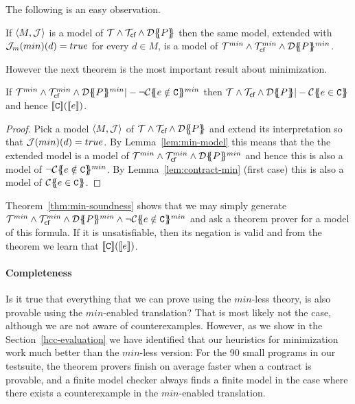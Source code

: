 The following is an easy observation.
\begin{lemma}\label{lem:min-model} If $\langle M,{\cal J}\rangle$ is a model of ${\cal T} \land {\cal T}_{\textsf{cf}} \land {\cal D}\{\!\!\{P\}\!\!\}$ then the same model, extended with
${\cal J}_m(min)(d) = true$ for every $d \in M$, is a model of ${\cal T}^{min} \land {\cal T}_{\textsf{cf}}^{min} \land {\cal D}\{\!\!\{P\}\!\!\}^{min}$.
\end{lemma}
However the next theorem is the most important result about minimization.
\begin{theorem}\label{thm:min-soundness} If $\ThMin\land \Th_{\lcfZ}^{min} \land \dtrans{}{P}^{min} |- \neg \ctransmin{}{}{e \notin \Ct}$ then
                   $\Th \land \Th_{\lcfZ} \land \dtrans{}{P} |- \ctrans{}{}{e \in \Ct}$ and hence $[\![{\tt C}]\!]([\![e]\!])$.
\end{theorem}
\begin{proof}
Pick a model $\langle M, {\cal J}\rangle$ of ${\cal T} \land {\cal T}_{\textsf{cf}} \land {\cal D}\{\!\!\{P\}\!\!\}$ and extend its interpretation
so that ${\cal J}(min)(d) = true$. By Lemma~\ref{lem:min-model} this means that the the extended model is a model of
${\cal T}^{min}\land {\cal T}_{\textsf{cf}}^{min} \land {\cal D}\{\!\!\{P\}\!\!\}^{min}$ and hence this is also a model of $\neg {\cal C}\{\!\!\{e \notin {\tt C}\}\!\!\}^{min}$.
By Lemma~\ref{lem:contract-min} (first case) this is also a model of ${\cal C}\{\!\!\{e \in {\tt C}\}\!\!\}$.
\end{proof}
Theorem~\ref{thm:min-soundness} shows that we may simply generate $\ThMin \land \Th_{\lcfZ}^{min} \land \dtrans{}{P}^{min} \land \neg \ctransmin{}{}{e \notin \Ct}$
and ask a theorem prover for a model of this formula. If it is unsatisfiable, then its negation is valid and from the theorem we learn that $[\![{\tt C}]\!]([\![e]\!])$.


\paragraph{Completeness}

Is it true that everything that we can prove using
the $min$-less theory, is also provable using the $min$-enabled translation?
That is most likely not the case, although we are not aware of counterexamples. However, as we show
in the Section~\ref{hcc-evaluation} we have identified that our heuristics for minimization work much
better than the $min$-less version: For the 90 small programs in our testsuite, the theorem provers
finish on average faster when a contract is provable, and a finite model checker always finds a finite
model in the case where there exists a counterexample in the $min$-enabled translation.


